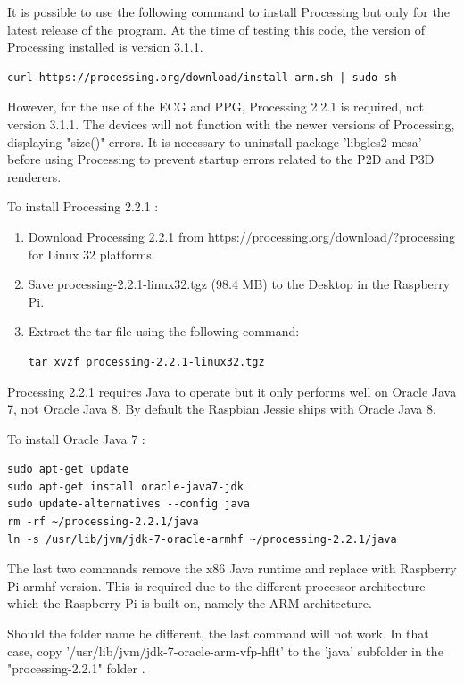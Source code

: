 It is possible to use the following command to install Processing but only for the latest release of the program. At the time of testing this code, the version of Processing installed is version 3.1.1. 

\begin{lstlisting}
curl https://processing.org/download/install-arm.sh | sudo sh
\end{lstlisting}

However, for the use of the ECG and PPG, Processing 2.2.1 is required, not version 3.1.1. The devices will not function with the newer versions of Processing, displaying "size()" errors. It is necessary to uninstall package 'libgles2-mesa' before using Processing to prevent startup errors related to the P2D and P3D renderers. 

To install Processing 2.2.1 \cite{installingprocessing}: 
\begin{enumerate}
	\item Download Processing 2.2.1 from https://processing.org/download/?processing for Linux 32 platforms. 
	\item Save processing-2.2.1-linux32.tgz (98.4 MB) to the Desktop in the Raspberry Pi.  
	\item Extract the tar file using the following command: 
	\begin{lstlisting}
tar xvzf processing-2.2.1-linux32.tgz
	\end{lstlisting}

\end{enumerate}

Processing 2.2.1 requires Java to operate but it only performs well on Oracle Java 7, not Oracle Java 8. By default the Raspbian Jessie ships with Oracle Java 8. 

To install Oracle Java 7 \cite{installingprocessing}: 

\begin{lstlisting}
sudo apt-get update
sudo apt-get install oracle-java7-jdk
sudo update-alternatives --config java
rm -rf ~/processing-2.2.1/java
ln -s /usr/lib/jvm/jdk-7-oracle-armhf ~/processing-2.2.1/java
\end{lstlisting}

The last two commands remove the x86 Java runtime and replace with Raspberry Pi armhf version. This is required due to the different processor architecture which the Raspberry Pi is built on, namely the ARM architecture. 

Should the folder name be different, the last command will not work. In that case, copy '/usr/lib/jvm/jdk-7-oracle-arm-vfp-hflt' to the 'java' subfolder in the "processing-2.2.1" folder \cite{installingprocessing}. 

